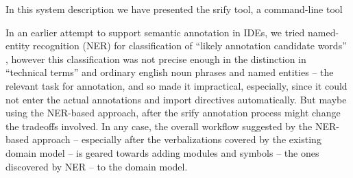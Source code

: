 \documentclass{llncs}
\newcommand\srf{\textsf{srify}\xspace}
\begin{document}
In this system description we have presented the \srf tool, a command-line tool

In an earlier attempt to support semantic annotation in IDEs, we tried named-entity
recognition (NER) for classification of ``likely annotation candidate words''
\cite{hutterer:msc23}, however this classification was not precise enough in the
distinction in ``technical terms'' and ordinary english noun phrases and named entities --
the relevant task for annotation, and so made it impractical, especially, since it could
not enter the actual annotations and import directives automatically. But maybe using the
NER-based approach, after the \srf annotation process might change the tradeoffs
involved. In any case, the overall workflow suggested by the NER-based approach --
especially after the verbalizations covered by the existing domain model -- is geared towards adding modules and symbols -- the ones discovered by NER
-- to the domain model. 



\printbibliography
\end{document}
